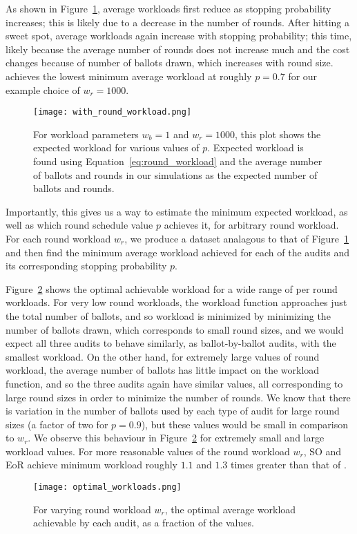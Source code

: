 As shown in Figure~\ref{fig:with_round_workload}, average workloads first reduce as stopping probability increases; this is likely due to a decrease in the number of rounds. After hitting a sweet spot, average workloads again increase with stopping probability; this time, likely because the average number of rounds does not increase much and the cost changes because of number of ballots drawn, which increases with round size. \Providence achieves the lowest minimum average workload at roughly $p=0.7$ for our example choice of $w_r=1000$.

\begin{figure}[h!]
\texttt{[image: with\_round\_workload.png]}
\caption{For workload parameters $w_b=1$ and $w_r=1000$, this plot shows the expected workload for various values of $p$. Expected workload is found using Equation~\ref{eq:round_workload} and the average number of ballots and rounds in our simulations as the expected number of ballots and rounds.}
\label{fig:with_round_workload}
\end{figure}

Importantly, this gives us a way to estimate the minimum expected workload, as well as which round schedule value $p$ achieves it, for arbitrary round workload. For each round workload $w_r$, we produce a dataset analagous to that of Figure~\ref{fig:with_round_workload} and then find the minimum average workload achieved for each of the audits and its corresponding stopping probability $p$. 

Figure~\ref{fig:optimal_workloads} shows the optimal achievable workload for a wide range of per round workloads. For very low round workloads, the workload function approaches just the total number of ballots, and so workload is minimized by minimizing the number of ballots drawn, which corresponds to small round sizes, and we would expect all three audits to behave similarly, as ballot-by-ballot audits, with the smallest workload. On the other hand, for extremely large values of round workload, the average number of ballots has little impact on the workload function, and so the three audits again have similar values, all corresponding to large round sizes in order to minimize the number of rounds.  We know that there is variation in the number of ballots used by each type of audit for large round sizes (a factor of two for $p=0.9$), but these values would be small in comparison to $w_r$. We observe this behaviour in Figure~\ref{fig:optimal_workloads} for extremely small and large workload values. For more reasonable values of the round workload $w_r$, SO \BRAVO and EoR \BRAVO achieve minimum workload roughly $1.1$ and $1.3$ times greater than that of \Providence.
\begin{figure}[h!]
\texttt{[image: optimal\_workloads.png]}
\caption{For varying round workload $w_r$, the optimal average workload achievable by each audit, as a fraction of the \Providence values.}
\label{fig:optimal_workloads}
\end{figure}


